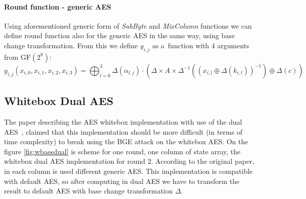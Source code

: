 \documentclass[11pt,oneside,final]{fithesis2}
\newcommand{\gfe}{\ensuremath{\text{GF}\left(2^8\right)}}
\begin{document}
	\paragraph*{Round function - generic AES}
	Using aforementioned generic form of \emph{SubByte} and \emph{MixColumn} functions we can define round function also for the generic AES in the same way, using base change transformation.
	From this we define $y_{i,j}$ as a~function with 4 arguments from $\gfe$:
	\begin{equation}
	y_{i,j}\left(x_{i,0}, x_{i,1}, x_{i,2}, x_{i,3}\right) = \bigoplus^3_{l=0} \Delta(\alpha_{l,j}) \cdot \left( \Delta \times A \times \Delta^{-1} \left( \left(x_{i,l} \oplus \Delta\left(k_{i,l}\right) \right)^{-1} \right) \oplus \Delta \left(c\right) \right)
	\end{equation}

	\subsection{Whitebox Dual AES}\label{sec:wb_dual_aes}
	The paper describing the AES whitebox implementation with use of the dual AES~\citep{Karroumi:2010:PWA:2041036.2041060}, claimed that this implementation should be more difficult (in terms of time complexity)
	to break using the BGE attack on the whitebox AES. On the figure \ref{fig:wbaesdual} is scheme for one round, one column of state array, the whitebox dual AES implementation for round 2.
	According to the original paper, in each
	column is used different generic AES. This implementation is compatible with default AES, so after computing in dual AES we have to transform the result to default AES
	with base change transformation $\Delta$.\\
\end{document}
